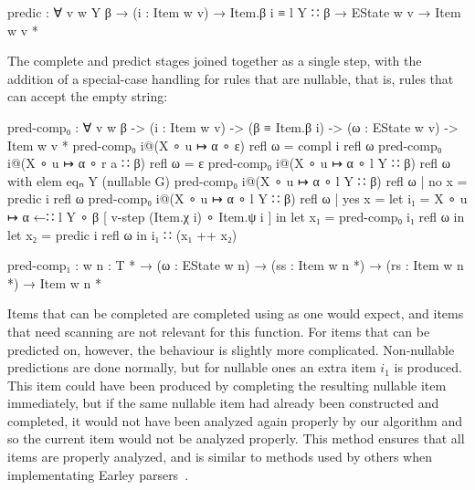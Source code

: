 		\begin{code}
			  predic : ∀ {v w Y β} →
			    (i : Item w v) → Item.β i ≡ l Y ∷ β →
			    EState w v →
			    Item w v *
		\end{code}

		The complete and predict stages joined together as a single step, with
		the addition of a special-case handling for rules that are nullable,
		that is, rules that can accept the empty string:

		\begin{code}
			  pred-comp₀ : ∀ {v w β} ->
			    (i : Item w v) ->
			    (β ≡ Item.β i) ->
			    (ω : EState w v) ->
			    Item w v *
			  pred-comp₀ i@(X ∘ u ↦ α ∘ ε) refl ω = compl i refl ω
			  pred-comp₀ i@(X ∘ u ↦ α ∘ r a ∷ β) refl ω = ε
			  pred-comp₀ i@(X ∘ u ↦ α ∘ l Y ∷ β) refl ω with elem eqₙ Y (nullable G)
			  pred-comp₀ i@(X ∘ u ↦ α ∘ l Y ∷ β) refl ω | no x = predic i refl ω
			  pred-comp₀ i@(X ∘ u ↦ α ∘ l Y ∷ β) refl ω | yes x =
			    let i₁ = X ∘ u ↦ α ←∷ l Y ∘ β [ v-step (Item.χ i) ∘ Item.ψ i ] in
			    let x₁ = pred-comp₀ i₁ refl ω in
			    let x₂ = predic i refl ω in
			    i₁ ∷ (x₁ ++ x₂)

			  pred-comp₁ : {w n : T *} → (ω : EState w n) →
			    (ss : Item w n *) → (rs : Item w n *) → Item w n *
		\end{code}

		Items that can be completed are completed using  as one
		would expect, and items that need scanning are not relevant for this
		function. For items that can be predicted on, however, the behaviour is
		slightly more complicated. Non-nullable predictions are done normally,
		but for nullable ones an extra item $i_1$ is produced. This item could
		have been produced by completing the resulting nullable item
		immediately, but if the same nullable item had already been constructed
		and completed, it would not have been analyzed again properly by our
		algorithm and so the current item would not be analyzed properly. This
		method ensures that all items are properly analyzed, and is similar to
		methods used by others when implementating Earley
		parsers~\cite{aycock02}.

